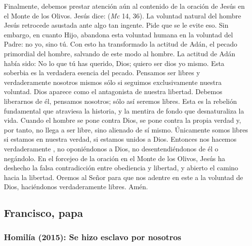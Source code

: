\begin{body}
Finalmente, debemos prestar atención aún al contenido de la oración de Jesús en el Monte de los Olivos. Jesús dice:  (\textit{Mc} 14, 36). La voluntad natural del hombre Jesús retrocede asustada ante algo tan ingente. Pide que se le evite eso. Sin embargo, en cuanto Hijo, abandona esta voluntad humana en la voluntad del Padre: no yo, sino tú. Con esto ha transformado la actitud de Adán, el pecado primordial del hombre, salvando de este modo al hombre. La actitud de Adán había sido: No lo que tú has querido, Dios; quiero ser dios yo mismo. Esta soberbia es la verdadera esencia del pecado. Pensamos ser libres y verdaderamente nosotros mismos sólo si seguimos exclusivamente nuestra voluntad. Dios aparece como el antagonista de nuestra libertad. Debemos liberarnos de él, pensamos nosotros; sólo así seremos libres. Esta es la rebelión fundamental que atraviesa la historia, y la mentira de fondo que desnaturaliza la vida. Cuando el hombre se pone contra Dios, se pone contra la propia verdad y, por tanto, no llega a ser libre, sino alienado de sí mismo. Únicamente somos libres si estamos en nuestra verdad, si estamos unidos a Dios. Entonces nos hacemos verdaderamente , no oponiéndonos a Dios, no desentendiéndonos de él o negándolo. En el forcejeo de la oración en el Monte de los Olivos, Jesús ha deshecho la falsa contradicción entre obediencia y libertad, y abierto el camino hacia la libertad. Oremos al Señor para que nos adentre en este  a la voluntad de Dios, haciéndonos verdaderamente libres. Amén.
\end{body}

\newsection
\subsection{Francisco, papa}

\subsubsection{Homilía (2015): Se hizo esclavo por nosotros}


